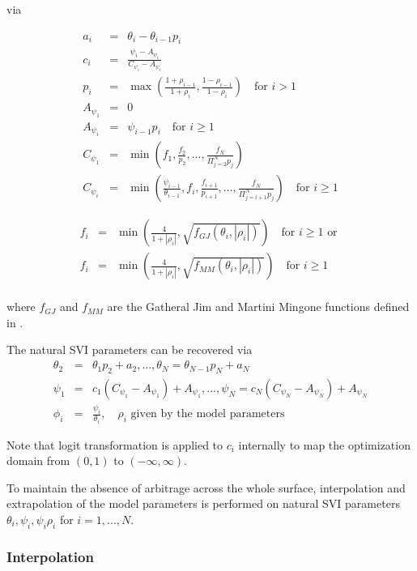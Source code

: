 \documentclass{amsart}
\theoremstyle{plain}
\numberwithin{equation}{section}
\begin{document}
via

\begin{eqnarray}
a_i &=& \theta_i - \theta_{i-1} p_i \\
c_i &=& \frac{\psi_i - A_{\psi_i}}{C_{\psi_i} - A_{\psi_i}} \\
p_i &=& \max \left( \frac{1 + \rho_{i-1}}{1 + \rho_i}, \frac{1 - \rho_{i-1}}{1 - \rho_i} \right) \quad \text{for } i > 1 \\
A_{\psi_1} &=& 0 \\
A_{\psi_i} &=& \psi_{i-1} p_i \quad \text{for } i \ge 1 \\
C_{\psi_1} &=& \min \left( f_1, \frac{f_2}{p_2}, ..., \frac{f_N}{\Pi^N_{j=2}p_j} \right) \\
C_{\psi_i} &=& \min \left( \frac{\psi_{i-1}}{\theta_{i-1}},f_i, \frac{f_{i+1}}{p_{i+1}}, ..., \frac{f_N}{\Pi^N_{j=i+1}p_j} \right) \quad \text{for } i \ge 1
\end{eqnarray}

\begin{eqnarray}
f_i &=& \min \left( \frac{4}{1+|\rho_i|}, \sqrt{f_{GJ}(\theta_i, |\rho_i|)}\right) \quad \text{for } i \ge 1 \text{ or }\\
f_i &=& \min \left( \frac{4}{1+|\rho_i|}, \sqrt{f_{MM}(\theta_i, |\rho_i|)}\right) \quad \text{for } i \ge 1 \\
\end{eqnarray}

where $f_{GJ}$ and $f_{MM}$ are the Gatheral Jim and Martini Mingone functions defined in \cite{Mingone_2022}.

The natural SVI parameters can be recovered via
\begin{eqnarray}
\theta_2 &=& \theta_1 p_2 + a_2, ..., \theta_N = \theta_{N-1} p_N + a_N \\
\psi_1 &=& c_1 (C_{\psi_1} - A_{\psi_1}) + A_{\psi_1}, ..., \psi_N = c_N (C_{\psi_N} - A_{\psi_N}) + A_{\psi_N} \\
\phi_i &=& \frac{\psi_i}{\theta_i}, \quad \rho_i \text{ given by the model parameters}
\end{eqnarray}

Note that logit transformation is applied to $c_i$ internally to map the optimization domain from $(0,1)$ to
$(-\infty, \infty)$.

To maintain the absence of arbitrage across the whole surface, interpolation and extrapolation of the model parameters is performed on natural SVI parameters $\theta_i, \psi_i, \psi_i \rho_i$ for $i = 1, ..., N$.

\subsubsection{Interpolation}
\end{document}
